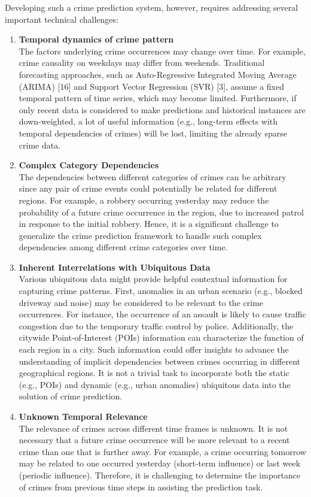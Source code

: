 \noindent Developing such a crime prediction system, however, requires
addressing several important technical challenges:
\begin{enumerate}
    \item \textbf{Temporal dynamics of crime pattern}\\[0.2cm]The factors underlying crime occurrences may change over time. For example, crime
    causality on weekdays may differ from weekends. Traditional forecasting approaches, such as Auto-Regressive Integrated Moving
    Average (ARIMA) [16] and Support Vector Regression (SVR) [3],
    assume a fixed temporal pattern of time series, which may become
    limited. Furthermore, if only recent data is considered to make predictions and historical instances are down-weighted, a lot of useful
    information (e.g., long-term effects with temporal dependencies of
    crimes) will be lost, limiting the already sparse crime data. 
    \newpage
    \item \textbf{Complex Category Dependencies}\\[0.2cm]
    The dependencies between different categories of crimes can be arbitrary since any pair of crime events could potentially be related for different regions. For example, a robbery occurring yesterday may reduce the probability of a future crime occurrence in the region, due to increased patrol in response to the initial robbery. Hence, it is a significant challenge to generalize the crime prediction framework to handle such complex dependencies among different crime categories over time.
    
    \item \textbf{Inherent Interrelations with Ubiquitous Data}\\[0.2cm]
    Various ubiquitous data might provide helpful contextual information for capturing crime patterns. First, anomalies in an urban scenario (e.g.,
    blocked driveway and noise) may be considered to be relevant to
    the crime occurrences. For instance, the occurrence of an assault is
    likely to cause traffic congestion due to the temporary traffic control by police. Additionally, the citywide Point-of-Interest (POIs)
    information can characterize the function of each region in a city.
    Such information could offer insights to advance the understanding of implicit dependencies between crimes occurring in different
    geographical regions. It is not a trivial task to incorporate both the
    static (e.g., POIs) and dynamic (e.g., urban anomalies) ubiquitous
    data into the solution of crime prediction.
    
    \item \textbf{Unknown Temporal Relevance}\\[0.2cm]
    The relevance of crimes across different time frames is unknown. It is not necessary that a future crime occurrence will be more relevant to a recent crime than one that is further away. For example, a crime occurring tomorrow may be related to one occurred yesterday (short-term influence) or last week (periodic influence). Therefore, it is challenging to determine the importance of crimes from previous time steps in assisting the prediction task.
\end{enumerate}
